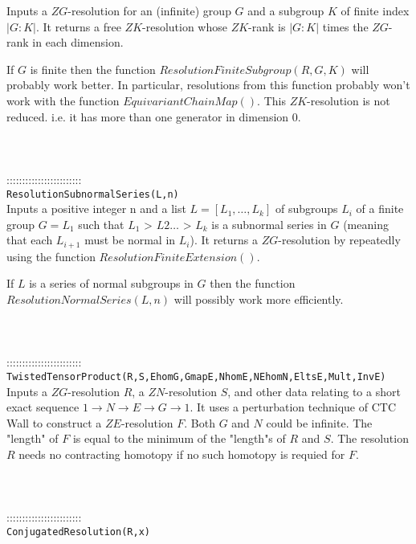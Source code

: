 \documentclass[a4paper,11pt]{report}
\begin{document}
{ Inputs a $ZG$-resolution for an (infinite) group $G$ and a subgroup $K$ of finite index $|G:K|$. It returns a free $ZK$-resolution whose $ZK$-rank is $|G:K|$ times the $ZG$-rank in each dimension.

 If $G$ is finite then the function $ResolutionFiniteSubgroup(R,G,K)$ will probably work better. In particular, resolutions from this function
probably won't work with the function $EquivariantChainMap()$. This $ZK$-resolution is not reduced. i.e. it has more than one generator in dimension
0. \\
 \\
 \\
 \\
 ::::::::::::::::::::::::\\
 \texttt{ResolutionSubnormalSeries(L,n) }\\
 

 Inputs a positive integer n and a list $L = [L_1 , \ldots , L_k]$ of subgroups $L_i$ of a finite group $G=L_1$ such that $L_1$ {\textgreater} $L2 \ldots $ {\textgreater} $L_k$ is a subnormal series in $G$ (meaning that each $L_{i+1}$ must be normal in $L_i$). It returns a $ZG$-resolution by repeatedly using the function $ResolutionFiniteExtension()$.

 If $L$ is a series of normal subgroups in $G$ then the function $ResolutionNormalSeries(L,n)$ will possibly work more efficiently. \\
 \\
 \\
 \\
 ::::::::::::::::::::::::\\
 \texttt{TwistedTensorProduct(R,S,EhomG,GmapE,NhomE,NEhomN,EltsE,Mult,InvE)}\\
 

 Inputs a $ZG$-resolution $R$, a $ZN$-resolution $S$, and other data relating to a short exact sequence $1 \longrightarrow N \longrightarrow E \longrightarrow G \longrightarrow 1$. It uses a perturbation technique of CTC Wall to construct a $ZE$-resolution $F$. Both $G$ and $N$ could be infinite. The "length" of $F$ is equal to the minimum of the "length"s of $R$ and $S$. The resolution $R$ needs no contracting homotopy if no such homotopy is requied for $F$. \\
 \\
 \\
 \\
 ::::::::::::::::::::::::\\
 \texttt{ConjugatedResolution(R,x)}\\
 

}
\end{document}
